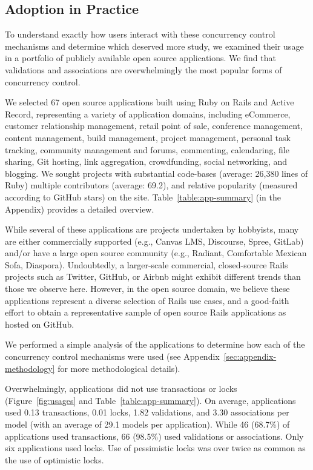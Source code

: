 \subsection{Adoption in Practice}

To understand exactly how users interact with these
concurrency control mechanisms and determine which deserved more
study, we examined their usage in a portfolio of publicly available
open source applications. We find that validations and associations
are overwhelmingly the most popular forms of concurrency control.

 We selected 67 open source applications
built using Ruby on Rails and Active Record, representing a variety of
application domains, including eCommerce, customer relationship
management, retail point of sale, conference management, content
management, build management, project management, personal task
tracking, community management and forums, commenting, calendaring,
file sharing, Git hosting, link aggregation, crowdfunding, social
networking, and blogging. We sought projects with substantial
code-bases (average: 26,380 lines of Ruby) multiple contributors
(average: 69.2), and relative popularity (measured according to GitHub
stars) on the site. Table~\ref{table:app-summary} (in the Appendix)
provides a detailed overview.


While several of these applications are projects undertaken by
hobbyists, many are either commercially supported (e.g., Canvas LMS,
Discourse, Spree, GitLab) and/or have a large open source community
(e.g., Radiant, Comfortable Mexican Sofa, Diaspora). Undoubtedly, a
larger-scale commercial, closed-source Rails projects such as Twitter,
GitHub, or Airbnb might exhibit different trends than those we observe
here. However, in the open source domain, we believe these
applications represent a diverse selection of Rails use cases, and a
good-faith effort to obtain a representative sample of open source
Rails applications as hosted on GitHub.

 We performed a simple analysis of the
applications to determine how each of the concurrency control
mechanisms were used (see Appendix~\ref{sec:appendix-methodology} for more
methodological details).

Overwhelmingly, applications did not use transactions or locks
(Figure~\ref{fig:usages} and Table~\ref{table:app-summary}). On
average, applications used 0.13 transactions, 0.01 locks, 1.82
validations, and 3.30 associations per model (with an average of 29.1
models per application). While 46 (68.7\%) of applications used
transactions, 66 (98.5\%) used validations or associations. Only six
applications used locks. Use of pessimistic locks was over twice
as common as the use of optimistic locks.

